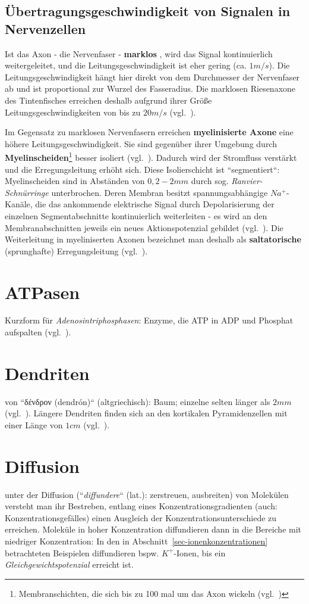 \subsection*{Übertragungsgeschwindigkeit von Signalen in Nervenzellen}
Ist das Axon - die Nervenfaser - \textbf{marklos} , wird das Signal kontinuierlich weitergeleitet, und die Leitungsgeschwindigkeit ist eher gering (ca. $1m/s$).
Die Leitungsgeschwindigkeit hängt hier direkt von dem Durchmesser der Nervenfaser ab und ist proportional zur Wurzel des Fasseradius.
Die marklosen Riesenaxone des Tintenfisches erreichen deshalb aufgrund ihrer Größe Leitungsgeschwindigkeiten von bis zu $20 m/s$ (vgl.~\cite[79]{Jon19}).

Im Gegensatz zu marklosen Nervenfasern erreichen \textbf{myelinisierte Axone} eine höhere Leitungsgeschwindigkeit.
Sie sind gegenüber ihrer Umgebung durch \textbf{Myelinscheiden}\footnote{
    Membranschichten, die sich bis zu 100 mal um das Axon wickeln (vgl.~\cite[79]{Jon19})
} besser isoliert (vgl.~\cite[48]{SD07}).
Dadurch wird der Stromfluss verstärkt und die Erregungsleitung erhöht sich.
Diese Isolierschicht ist ``segmentiert``: Myelinscheiden sind in Abständen von $0,2 - 2mm$ durch sog.  \textit{Ranvier-Schnürringe} unterbrochen.
Deren Membran besitzt spannungsabhängige $Na^+$-Kanäle, die das ankommende elektrische Signal durch  Depolarisierung der einzelnen Segmentabschnitte kontinuierlich weiterleiten - es wird an den Membranabschnitten jeweils ein neues Aktionspotenzial gebildet (vgl.~\cite[48]{SD07}).
Die Weiterleitung in myeliniserten Axonen bezeichnet man deshalb als \textbf{saltatorische} (sprunghafte) Erregungsleitung (vgl.~\cite[109 f.]{BCP18}).

\section{ATPasen}\label{appendix:atpasen}
Kurzform für \textit{Adenosintriphosphasen}: Enzyme, die ATP in ADP und Phosphat aufspalten (vgl.~\cite[26]{SD07}).

\section{Dendriten}\label{appendix:dendriten}
von ``\textgreek{δένδρον} (dendrón)`` (altgriechisch): Baum; einzelne selten länger als $2 mm$ (vgl.~\cite[28]{BCP18}).
Längere Dendriten finden sich an den kortikalen Pyramidenzellen mit einer Länge von $1 cm$ (vgl.~\cite[58]{Eil19}).

\section{Diffusion}\label{appendix:diffusion}
unter der Diffusion (``\textit{diffundere}`` (lat.): zerstreuen, ausbreiten) von Molekülen versteht man ihr Bestreben, entlang eines Konzentrationsgradienten (auch: Konzentrationsgefälles) einen Ausgleich der Konzentrationsunterschiede zu erreichen.
Moleküle in hoher Konzentration diffundieren dann in die Bereiche mit niedriger Konzentration: In den in Abschnitt~\ref{sec-ionenkonzentrationen} betrachteten Beispielen diffundieren bspw. $K^+$-Ionen, bis ein \textit{Gleichgewichtspotenzial} erreicht ist.


